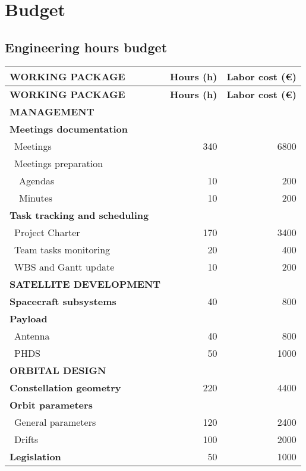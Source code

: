 \documentclass[11pt,a4paper]{article}
\begin{document}
\section{Budget}
\subsection{Engineering hours budget}

\begin{longtable}{| l | r | r | }
\hline
\rowcolor[gray]{0.65}	\textbf{WORKING PACKAGE} &  \textbf{Hours (h)}     & \textbf{Labor cost (\euro)}   \\
\hline
\endfirsthead

\hline
\rowcolor[gray]{0.65}	\textbf{WORKING PACKAGE} &  \textbf{Hours (h)}     & \textbf{Labor cost (\euro)}   \\
\hline
\endhead

\rowcolor[gray]{0.85} \textbf{MANAGEMENT} &  &  \\

	\textbf{Meetings documentation} & & \\
	   \blue ~Meetings & 340  & 6800  \\
	   \blue ~Meetings preparation & &   \\
	   ~~Agendas & 10 & 200 \\
	   ~~Minutes & 10 & 200 \\
	\hline
	\textbf{Task tracking and scheduling} & & \\
	   \blue ~Project Charter & 170 & 3400  \\
	   \blue ~Team tasks monitoring & 20 & 400  \\
	   \blue ~WBS and Gantt update & 10 & 200 \\

\rowcolor[gray]{0.85}	\textbf{SATELLITE DEVELOPMENT} &  &   \\
	
	\textbf{Spacecraft subsystems} & 40  & 800 \\
	\hline
	\textbf{Payload} &   &  \\
	   \blue ~Antenna & 40  & 800  \\
	   \blue ~PHDS & 50  & 1000  \\

\rowcolor[gray]{0.85}	\textbf{ORBITAL DESIGN} &  & \\

	\textbf{Constellation geometry} & 220  & 4400  \\
	\hline
	\textbf{Orbit parameters} &   &  \\
	   \blue ~General parameters & 120  & 2400  \\
	   \blue ~Drifts & 100 & 2000  \\
	\hline
	\textbf{Legislation} & 50 & 1000 \\
   

\end{longtable}
\end{document}
